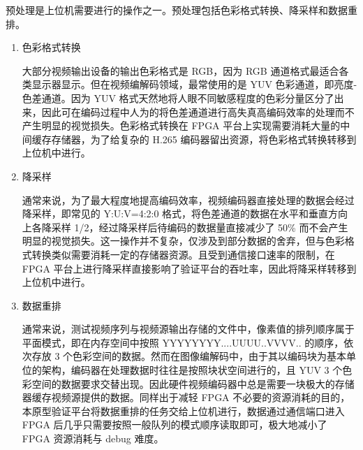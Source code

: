 预处理是上位机需要进行的操作之一。预处理包括色彩格式转换、降采样和数据重排。
\begin{enumerate}
    \item 色彩格式转换

          大部分视频输出设备的输出色彩格式是 RGB，因为 RGB 通道格式最适合各类显示器显示。但在视频编解码领域，最常使用的是 YUV 色彩通道，即亮度-色差通道。因为 YUV 格式天然地将人眼不同敏感程度的色彩分量区分了出来，因此可在编码过程中人为的将色差通道进行高失真高编码效率的处理而不产生明显的视觉损失。色彩格式转换在 FPGA 平台上实现需要消耗大量的中间缓存存储器，为了给复杂的 H.265 编码器留出资源，将色彩格式转换转移到上位机中进行。

    \item 降采样

          通常来说，为了最大程度地提高编码效率，视频编码器直接处理的数据会经过降采样，即常见的 Y:U:V=4:2:0 格式，将色差通道的数据在水平和垂直方向上各降采样 1/2，经过降采样后待编码的数据量直接减少了 50\% 而不会产生明显的视觉损失。这一操作并不复杂，仅涉及到部分数据的舍弃，但与色彩格式转换类似需要消耗一定的存储器资源。且受到通信接口速率的限制，在 FPGA 平台上进行降采样直接影响了验证平台的吞吐率，因此将降采样转移到上位机中进行。

    \item 数据重排

          通常来说，测试视频序列与视频源输出存储的文件中，像素值的排列顺序属于平面模式，即在内存空间中按照 YYYYYYYY....UUUU..VVVV.. 的顺序，依次存放 3 个色彩空间的数据。然而在图像编解码中，由于其以编码块为基本单位的架构，编码器在处理数据时往往是按照块状空间进行的，且 YUV 3 个色彩空间的数据要求交替出现。因此硬件视频编码器中总是需要一块极大的存储器缓存视频源提供的数据。同样出于减轻 FPGA 不必要的资源消耗的目的，本原型验证平台将数据重排的任务交给上位机进行，数据通过通信端口进入 FPGA 后几乎只需要按照一般队列的模式顺序读取即可，极大地减小了 FPGA 资源消耗与 debug 难度。
\end{enumerate}

